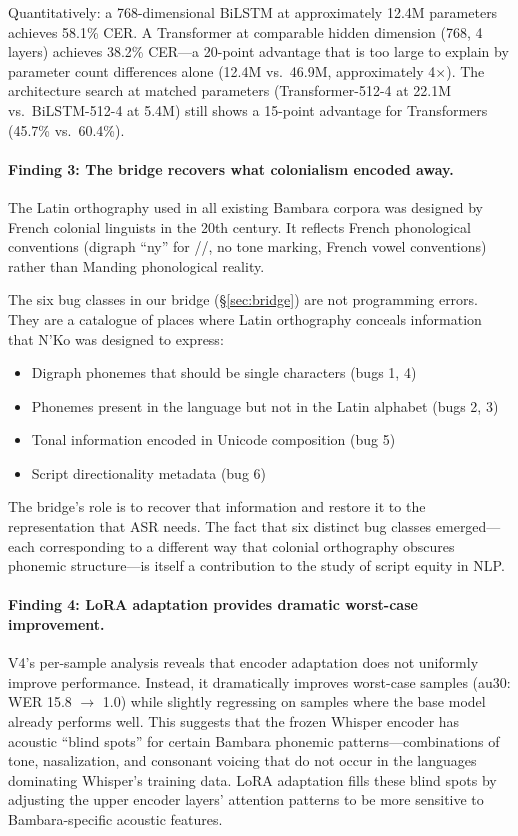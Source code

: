 \documentclass[11pt]{article}
\begin{document}
Quantitatively: a 768-dimensional BiLSTM at approximately 12.4M parameters achieves 58.1\% CER.
A Transformer at comparable hidden dimension (768, 4 layers) achieves 38.2\% CER---a 20-point advantage that is too large to explain by parameter count differences alone (12.4M vs.\ 46.9M, approximately 4$\times$).
The architecture search at matched parameters (Transformer-512-4 at 22.1M vs.\ BiLSTM-512-4 at 5.4M) still shows a 15-point advantage for Transformers (45.7\% vs.\ 60.4\%).

\paragraph{Finding 3: The bridge recovers what colonialism encoded away.}
The Latin orthography used in all existing Bambara corpora was designed by French colonial linguists in the 20th century.
It reflects French phonological conventions (digraph ``ny'' for //, no tone marking, French vowel conventions) rather than Manding phonological reality.

The six bug classes in our bridge (\S\ref{sec:bridge}) are not programming errors.
They are a catalogue of places where Latin orthography conceals information that N'Ko was designed to express:
\begin{itemize}
\item Digraph phonemes that should be single characters (bugs 1, 4)
\item Phonemes present in the language but not in the Latin alphabet (bugs 2, 3)
\item Tonal information encoded in Unicode composition (bug 5)
\item Script directionality metadata (bug 6)
\end{itemize}

The bridge's role is to recover that information and restore it to the representation that ASR needs.
The fact that six distinct bug classes emerged---each corresponding to a different way that colonial orthography obscures phonemic structure---is itself a contribution to the study of script equity in NLP.

\paragraph{Finding 4: LoRA adaptation provides dramatic worst-case improvement.}
V4's per-sample analysis reveals that encoder adaptation does not uniformly improve performance.
Instead, it dramatically improves worst-case samples (au30: WER 15.8 $\to$ 1.0) while slightly regressing on samples where the base model already performs well.
This suggests that the frozen Whisper encoder has acoustic ``blind spots'' for certain Bambara phonemic patterns---combinations of tone, nasalization, and consonant voicing that do not occur in the languages dominating Whisper's training data.
LoRA adaptation fills these blind spots by adjusting the upper encoder layers' attention patterns to be more sensitive to Bambara-specific acoustic features.
\end{document}
